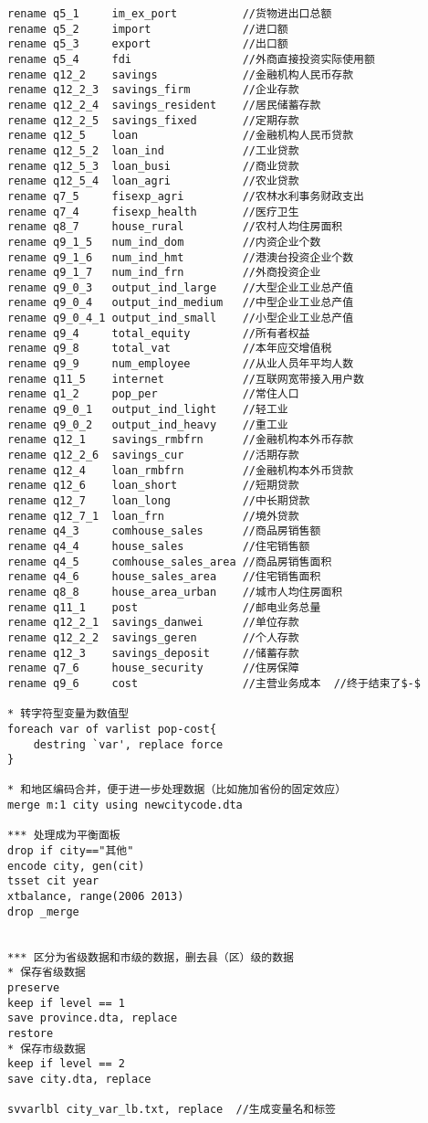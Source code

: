 \begin{lstlisting}[frame=single]
rename q5_1		im_ex_port			//货物进出口总额
rename q5_2		import				//进口额
rename q5_3		export				//出口额
rename q5_4		fdi					//外商直接投资实际使用额
rename q12_2	savings				//金融机构人民币存款
rename q12_2_3	savings_firm		//企业存款
rename q12_2_4	savings_resident	//居民储蓄存款
rename q12_2_5	savings_fixed		//定期存款
rename q12_5	loan				//金融机构人民币贷款
rename q12_5_2	loan_ind			//工业贷款
rename q12_5_3	loan_busi			//商业贷款
rename q12_5_4	loan_agri			//农业贷款
rename q7_5		fisexp_agri			//农林水利事务财政支出
rename q7_4		fisexp_health		//医疗卫生
rename q8_7		house_rural			//农村人均住房面积
rename q9_1_5	num_ind_dom			//内资企业个数
rename q9_1_6	num_ind_hmt			//港澳台投资企业个数
rename q9_1_7	num_ind_frn			//外商投资企业
rename q9_0_3	output_ind_large	//大型企业工业总产值
rename q9_0_4	output_ind_medium	//中型企业工业总产值
rename q9_0_4_1 output_ind_small	//小型企业工业总产值
rename q9_4		total_equity		//所有者权益
rename q9_8		total_vat			//本年应交增值税
rename q9_9		num_employee		//从业人员年平均人数
rename q11_5	internet			//互联网宽带接入用户数
rename q1_2		pop_per				//常住人口
rename q9_0_1	output_ind_light	//轻工业
rename q9_0_2	output_ind_heavy	//重工业
rename q12_1	savings_rmbfrn		//金融机构本外币存款
rename q12_2_6	savings_cur			//活期存款
rename q12_4	loan_rmbfrn			//金融机构本外币贷款
rename q12_6	loan_short			//短期贷款
rename q12_7	loan_long			//中长期贷款
rename q12_7_1	loan_frn			//境外贷款
rename q4_3		comhouse_sales		//商品房销售额
rename q4_4		house_sales			//住宅销售额
rename q4_5		comhouse_sales_area	//商品房销售面积
rename q4_6		house_sales_area	//住宅销售面积
rename q8_8		house_area_urban	//城市人均住房面积
rename q11_1	post				//邮电业务总量
rename q12_2_1	savings_danwei		//单位存款
rename q12_2_2	savings_geren		//个人存款
rename q12_3	savings_deposit		//储蓄存款
rename q7_6		house_security		//住房保障
rename q9_6		cost				//主营业务成本  //终于结束了$-$

* 转字符型变量为数值型
foreach var of varlist pop-cost{
	destring `var', replace force
}

* 和地区编码合并，便于进一步处理数据（比如施加省份的固定效应）
merge m:1 city using newcitycode.dta

*** 处理成为平衡面板
drop if city=="其他"
encode city, gen(cit)
tsset cit year
xtbalance, range(2006 2013)
drop _merge


*** 区分为省级数据和市级的数据，删去县（区）级的数据
* 保存省级数据
preserve 
keep if level == 1
save province.dta, replace
restore
* 保存市级数据
keep if level == 2
save city.dta, replace

svvarlbl city_var_lb.txt, replace  //生成变量名和标签
\end{lstlisting}

